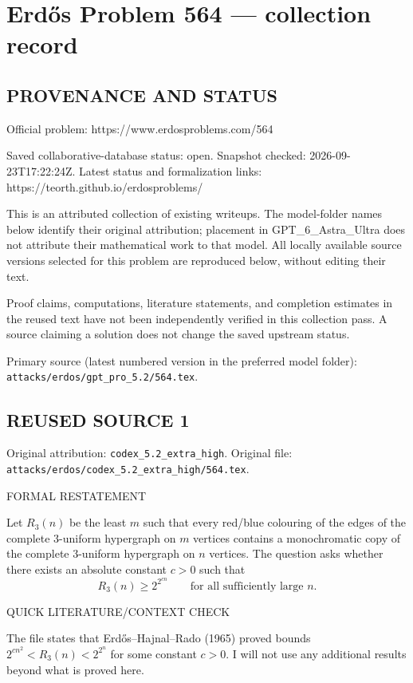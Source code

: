 \section*{Erd\H{o}s Problem 564 --- collection record}

\subsection*{PROVENANCE AND STATUS}
Official problem: https://www.erdosproblems.com/564

Saved collaborative-database status: open.
Snapshot checked: 2026-09-23T17:22:24Z.
Latest status and formalization links: https://teorth.github.io/erdosproblems/

This is an attributed collection of existing writeups. The model-folder names below identify their original attribution; placement in GPT\_6\_Astra\_Ultra does not attribute their mathematical work to that model. All locally available source versions selected for this problem are reproduced below, without editing their text.

Proof claims, computations, literature statements, and completion estimates in the reused text have not been independently verified in this collection pass. A source claiming a solution does not change the saved upstream status.

Primary source (latest numbered version in the preferred model folder): \texttt{attacks/erdos/gpt\_pro\_5.2/564.tex}.

\subsection*{REUSED SOURCE 1}
Original attribution: \texttt{codex\_5.2\_extra\_high}.
Original file: \texttt{attacks/erdos/codex\_5.2\_extra\_high/564.tex}.

FORMAL RESTATEMENT

Let $R_3(n)$ be the least $m$ such that every red/blue colouring of the edges of the complete $3$-uniform hypergraph on $m$ vertices contains a monochromatic copy of the complete $3$-uniform hypergraph on $n$ vertices.
The question asks whether there exists an absolute constant $c>0$ such that
\[
R_3(n) \ge 2^{2^{c n}} \qquad\text{for all sufficiently large }n.
\]

QUICK LITERATURE/CONTEXT CHECK

The file states that Erd\H{o}s--Hajnal--Rado (1965) proved bounds
$2^{c n^2} < R_3(n) < 2^{2^{n}}$ for some constant $c>0$.
I will not use any additional results beyond what is proved here.

